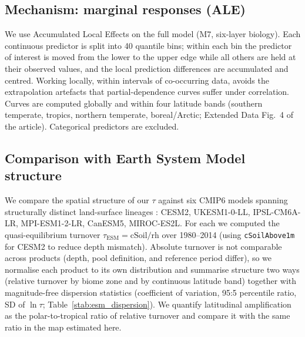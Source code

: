 \documentclass[12pt, a4paper]{article}
\begin{document}
\subsection{Mechanism: marginal responses (ALE)}
\label{sec:si_ale}
We use Accumulated Local Effects \citep{Apley2020} on the full model (M7, six-layer
biology). Each continuous predictor is split into 40 quantile bins; within each bin the
predictor of interest is moved from the lower to the upper edge while all others are held
at their observed values, and the local prediction differences are accumulated and
centred. Working locally, within intervals of co-occurring data, avoids the
extrapolation artefacts that partial-dependence curves suffer under correlation. Curves
are computed globally and within four latitude bands (southern temperate, tropics,
northern temperate, boreal/Arctic; Extended Data Fig.~4 of the article). Categorical
predictors are excluded.

\subsection{Comparison with Earth System Model structure}
We compare the spatial structure of our $\tau$ against six CMIP6 models spanning
structurally distinct land-surface lineages \citep{Varney2022}: CESM2, UKESM1-0-LL,
IPSL-CM6A-LR, MPI-ESM1-2-LR, CanESM5, MIROC-ES2L. For each we computed the
quasi-equilibrium turnover $\tau_\text{ESM}=\text{cSoil}/\text{rh}$
\citep{Koven2017,Carvalhais2014} over 1980--2014 (using \texttt{cSoilAbove1m} for CESM2
to reduce depth mismatch). Absolute turnover is not comparable across products (depth,
pool definition, and reference period differ), so we normalise each product to its own
distribution and summarise structure two ways (relative turnover by biome zone and by
continuous latitude band) together with magnitude-free dispersion statistics
(coefficient of variation, 95:5 percentile ratio, SD of $\ln\tau$;
Table~\ref{stab:esm_dispersion}). We quantify latitudinal amplification as the
polar-to-tropical ratio of relative turnover and compare it with the same ratio in the
map estimated here.
\end{document}
